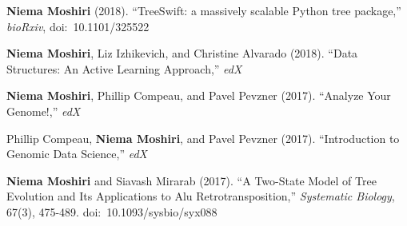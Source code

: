 \begin{frontmatter}
\begin{vitapage}
\begin{publications}
\item \textbf{Niema Moshiri} (2018). ``TreeSwift: a massively scalable Python tree package,'' \textit{bioRxiv}, doi:~10.1101/325522
\item \textbf{Niema Moshiri}, Liz Izhikevich, and Christine Alvarado (2018). ``Data Structures: An Active Learning Approach,'' \textit{edX}
\item \textbf{Niema Moshiri}, Phillip Compeau, and Pavel Pevzner (2017). ``Analyze Your Genome!,'' \textit{edX}
\item Phillip Compeau, \textbf{Niema Moshiri}, and Pavel Pevzner (2017). ``Introduction to Genomic Data Science,'' \textit{edX}
\item \textbf{Niema Moshiri} and Siavash Mirarab (2017). ``A Two-State Model of Tree Evolution and Its Applications to Alu Retrotransposition,'' \textit{Systematic Biology}, 67(3), 475-489. doi:~10.1093/sysbio/syx088
\end{publications}
\end{vitapage}


\end{frontmatter}
